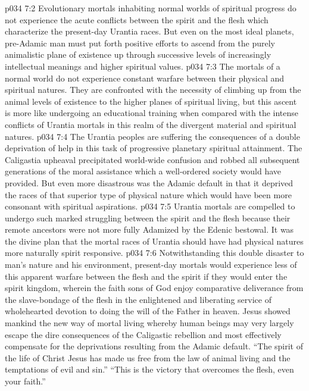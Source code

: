 \vs p034 7:2 Evolutionary mortals inhabiting normal worlds of spiritual progress do not experience the acute conflicts between the spirit and the flesh which characterize the present\hyp{}day Urantia races. But even on the most ideal planets, pre\hyp{}Adamic man must put forth positive efforts to ascend from the purely animalistic plane of existence up through successive levels of increasingly intellectual meanings and higher spiritual values.
\vs p034 7:3 The mortals of a normal world do not experience constant warfare between their physical and spiritual natures. They are confronted with the necessity of climbing up from the animal levels of existence to the higher planes of spiritual living, but this ascent is more like undergoing an educational training when compared with the intense conflicts of Urantia mortals in this realm of the divergent material and spiritual natures.
\vs p034 7:4 \pc The Urantia peoples are suffering the consequences of a double deprivation of help in this task of progressive planetary spiritual attainment. The Caligastia upheaval precipitated world\hyp{}wide confusion and robbed all subsequent generations of the moral assistance which a well\hyp{}ordered society would have provided. But even more disastrous was the Adamic default in that it deprived the races of that superior type of physical nature which would have been more consonant with spiritual aspirations.
\vs p034 7:5 Urantia mortals are compelled to undergo such marked struggling between the spirit and the flesh because their remote ancestors were not more fully Adamized by the Edenic bestowal. It was the divine plan that the mortal races of Urantia should have had physical natures more naturally spirit responsive.
\vs p034 7:6 \pc Notwithstanding this double disaster to man’s nature and his environment, present\hyp{}day mortals would experience less of this apparent warfare between the flesh and the spirit if they would enter the spirit kingdom, wherein the faith sons of God enjoy comparative deliverance from the slave\hyp{}bondage of the flesh in the enlightened and liberating service of wholehearted devotion to doing the will of the Father in heaven. Jesus showed mankind the new way of mortal living whereby human beings may very largely escape the dire consequences of the Caligastic rebellion and most effectively compensate for the deprivations resulting from the Adamic default. “The spirit of the life of Christ Jesus has made us free from the law of animal living and the temptations of evil and sin.” “This is the victory that overcomes the flesh, even your faith.”

